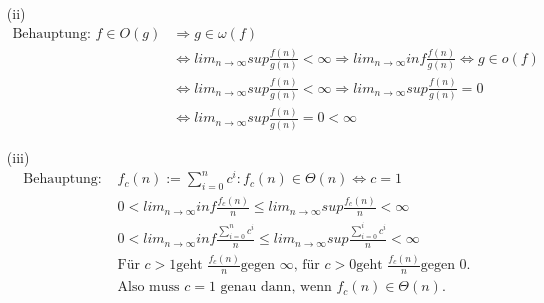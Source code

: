 \documentclass{article}
\begin{document}
\begin{enumerate}
\begin{enumerate}
\item[(ii)]
	\begin{align*}
		\text{Behauptung: } f \in O(g) &\Rightarrow g \in \omega(f) \\
		&\Leftrightarrow lim_{n \rightarrow \infty} sup \frac{f(n)}{g(n)} 
			< \infty \Rightarrow lim_{n \rightarrow \infty} inf 
			\frac{f(n)}{g(n)} \Leftrightarrow g \in o(f) \\
		&\Leftrightarrow lim_{n \rightarrow \infty} sup \frac{f(n)}{g(n)} 
			< \infty \Rightarrow lim_{n \rightarrow \infty} sup
                        \frac{f(n)}{g(n)} = 0 \\
		&\Leftrightarrow lim_{n \rightarrow \infty} sup \frac{f(n)}{g(n)} = 0 
			< \infty 
	\end{align*}

\item[(iii)]
	\begin{align*}
	\text{Behauptung: } &f_c(n) := \sum_{i=0}^n c^i: f_c(n) \in \Theta(n) \Leftrightarrow c=1 \\
	&0 < lim_{n \rightarrow \infty} inf \frac{f_c(n)}{n} \le lim_{n \rightarrow \infty} sup \frac{f_c(n)}{n} < \infty \\
	&0 < lim_{n \rightarrow \infty} inf \frac{\sum_{i=0}^n c^i}{n} \le lim_{n \rightarrow \infty} sup \frac{\sum_{i=0}^i c^i}{n} < \infty \\
	&\text{Für } c > 1 \text{geht } \frac{f_c(n)}{n} \text{gegen } \infty \text{, für } c > 0 \text{geht }  \frac{f_c(n)}{n} \text{gegen 0.} \\
	&\text{Also muss } c = 1 \text{ genau dann, wenn } f_c(n) \in \Theta(n).
	\end{align*}
\end{enumerate}


\end{enumerate}
\end{document}

